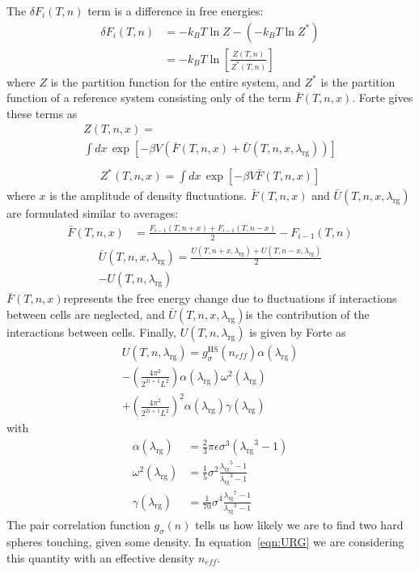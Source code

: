 \documentclass[letterpaper,twocolumn,amsmath,amssymb,prb]{revtex4-1}
\newcommand{\kT}{\ensuremath{k_BT}}
\newcommand{\neff}{\ensuremath{n_\textit{eff}}}
\newcommand{\lambdaRG}{\ensuremath{\lambda_\text{rg}}}
\newcommand{\FbarD}{\ensuremath{\bar{F}(T,n,x)}}
\newcommand{\UbarD}{\ensuremath{\bar{U}(T,n,x,\lambdaRG)}}
\begin{document}
The $\delta F_i(T,n)$ term is a difference in free energies:
\begin{align}
  \delta F_i(T,n) &= -\kT\ln Z - \left( -\kT\ln Z^* \right) \nonumber \\
  &= -\kT\ln\left[ \frac{Z(T,n)}{Z^*(T,n)} \right]
\end{align}
where $Z$ is the partition function for the entire system, and $Z^*$
is the partition function of a reference system consisting only of the
term $\FbarD$. Forte gives these terms as
\begin{multline}
  Z(T,n,x) = \\ \int dx\, \exp\left[-\beta V\left( \FbarD + \UbarD \right)\right] \label{eqn:Z} \\
\end{multline}
\begin{multline}
  Z^*(T,n,x) = \int dx\, \exp\left[ -\beta V\FbarD \right] \label{eqn:Zstar}
\end{multline}
where $x$ is the amplitude of density fluctuations. $\FbarD$ and $\UbarD$ are formulated similar to averages:
\begin{align}
  \FbarD &= \frac{F_{i-1}(T,n+x) + F_{i-1}(T,n-x)}{2} - F_{i-1}(T,n)
\end{align}
\begin{multline}
  \UbarD = \frac{U(T,n+x,\lambdaRG) + U(T,n-x,\lambdaRG)}{2} \\
  - U(T,n,\lambdaRG)
\end{multline}
\FbarD represents the free energy change due to fluctuations if interactions between cells are neglected, and \UbarD is the contribution of the interactions between cells. Finally, $U(T,n,\lambdaRG)$ is given by Forte as
\begin{multline}
  U(T,n,\lambdaRG) = g_\sigma^\text{HS}(\neff)\alpha(\lambdaRG) \\
  - \left( \frac{4\pi^2}{2^{2i+1}L^2} \right)\alpha(\lambdaRG)\omega^2(\lambdaRG) \\
  + \left( \frac{4\pi^2}{2^{2i+1}L^2} \right)^2\alpha(\lambdaRG)\gamma(\lambdaRG) \label{eqn:URG} %
\end{multline}
with
\begin{align}
  \alpha(\lambdaRG) &= \frac{2}{3}\pi\epsilon\sigma^3(\lambdaRG^3 - 1) \\
  \omega^2(\lambdaRG) &= \frac{1}{5}\sigma^2\frac{\lambdaRG^5 - 1}{\lambdaRG^3 - 1} \\
  \gamma(\lambdaRG) &= \frac{1}{70}\sigma^4\frac{\lambdaRG^7 - 1}{\lambdaRG^3 - 1}
\end{align}
The pair correlation function $g_\sigma(n)$ tells us how likely we
are to find two hard spheres touching, given some density. In
equation~\ref{eqn:URG} we are considering this quantity with an
effective density \neff.
\end{document}
